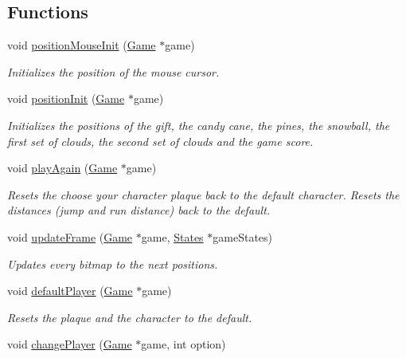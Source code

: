 \subsection*{Functions}
\begin{DoxyCompactItemize}
\item 
void \hyperlink{group___graphics_ga16103b3c6b6139878e7c3de81cf56925}{position\+Mouse\+Init} (\hyperlink{struct_game}{Game} $\ast$game)
\begin{DoxyCompactList}\small\item\em Initializes the position of the mouse cursor. \end{DoxyCompactList}\item 
void \hyperlink{group___graphics_ga2b9d84216dd1b37a440ca6b71784c2fc}{position\+Init} (\hyperlink{struct_game}{Game} $\ast$game)
\begin{DoxyCompactList}\small\item\em Initializes the positions of the gift, the candy cane, the pines, the snowball, the first set of clouds, the second set of clouds and the game score. \end{DoxyCompactList}\item 
void \hyperlink{group___graphics_gaaa565b7e974eec01db91380f3ba991d2}{play\+Again} (\hyperlink{struct_game}{Game} $\ast$game)
\begin{DoxyCompactList}\small\item\em Resets the choose your character plaque back to the default character. Resets the distances (jump and run distance) back to the default. \end{DoxyCompactList}\item 
void \hyperlink{group___graphics_gae5f0e30e1262615f852a85d4db3c8261}{update\+Frame} (\hyperlink{struct_game}{Game} $\ast$game, \hyperlink{struct_states}{States} $\ast$game\+States)
\begin{DoxyCompactList}\small\item\em Updates every bitmap to the next positions. \end{DoxyCompactList}\item 
void \hyperlink{group___graphics_gabde7c0fefaf3424db78158c805037cd3}{default\+Player} (\hyperlink{struct_game}{Game} $\ast$game)
\begin{DoxyCompactList}\small\item\em Resets the plaque and the character to the default. \end{DoxyCompactList}\item 
void \hyperlink{group___graphics_ga1ff7208d640a7d4c62a49f5f81306be4}{change\+Player} (\hyperlink{struct_game}{Game} $\ast$game, int option)

\end{DoxyCompactItemize}
